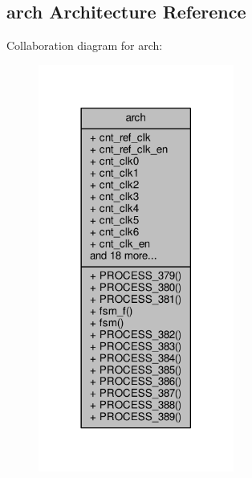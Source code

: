 \subsection{arch Architecture Reference}
\label{classclk__with__ref__test_1_1arch}


Collaboration diagram for arch\+:\nopagebreak
\begin{figure}[H]
\begin{center}
\leavevmode
\includegraphics[width=182pt]{d7/d53/classclk__with__ref__test_1_1arch__coll__graph}
\end{center}
\end{figure}
